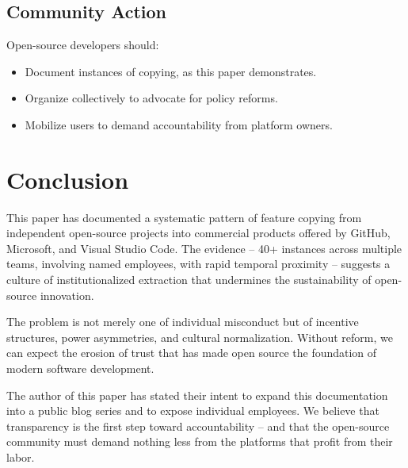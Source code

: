 \documentclass[12pt]{article}
\begin{document}
\subsection{Community Action}
Open-source developers should:
\begin{itemize}
\item Document instances of copying, as this paper demonstrates.
\item Organize collectively to advocate for policy reforms.
\item Mobilize users to demand accountability from platform owners.
\end{itemize}

\section{Conclusion}
This paper has documented a systematic pattern of feature copying from independent open-source projects into commercial products offered by GitHub, Microsoft, and Visual Studio Code. The evidence -- 40+ instances across multiple teams, involving named employees, with rapid temporal proximity -- suggests a culture of institutionalized extraction that undermines the sustainability of open-source innovation.

The problem is not merely one of individual misconduct but of incentive structures, power asymmetries, and cultural normalization. Without reform, we can expect the erosion of trust that has made open source the foundation of modern software development.

The author of this paper has stated their intent to expand this documentation into a public blog series and to expose individual employees. We believe that transparency is the first step toward accountability -- and that the open-source community must demand nothing less from the platforms that profit from their labor.



\end{document}
